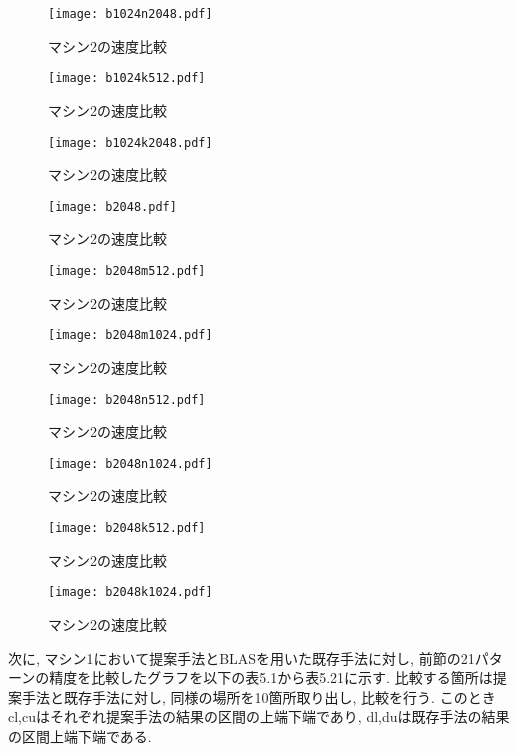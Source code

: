 \documentclass[11pt,a4paper]{jsreport}
\theoremstyle{definition}
\begin{document}
\begin{figure}[H]
\centering
\texttt{[image: b1024n2048.pdf]}
\caption{マシン2の速度比較}
\end{figure}

\begin{figure}[H]
\centering
\texttt{[image: b1024k512.pdf]}
\caption{マシン2の速度比較}
\end{figure}

\begin{figure}[H]
\centering
\texttt{[image: b1024k2048.pdf]}
\caption{マシン2の速度比較}
\end{figure}

\begin{figure}[H]
\centering
\texttt{[image: b2048.pdf]}
\caption{マシン2の速度比較}
\end{figure}

\begin{figure}[H]
\centering
\texttt{[image: b2048m512.pdf]}
\caption{マシン2の速度比較}
\end{figure}

\begin{figure}[H]
\centering
\texttt{[image: b2048m1024.pdf]}
\caption{マシン2の速度比較}
\end{figure}

\begin{figure}[H]
\centering
\texttt{[image: b2048n512.pdf]}
\caption{マシン2の速度比較}
\end{figure}

\begin{figure}[H]
\centering
\texttt{[image: b2048n1024.pdf]}
\caption{マシン2の速度比較}
\end{figure}

\begin{figure}[H]
\centering
\texttt{[image: b2048k512.pdf]}
\caption{マシン2の速度比較}
\end{figure}

\begin{figure}[H]
\centering
\texttt{[image: b2048k1024.pdf]}
\caption{マシン2の速度比較}
\end{figure}

\indent 次に, マシン1において提案手法とBLASを用いた既存手法に対し, 前節の21パターンの精度を比較したグラフを以下の表5.1から表5.21に示す. 比較する箇所は提案手法と既存手法に対し, 同様の場所を10箇所取り出し, 比較を行う. このときcl,cuはそれぞれ提案手法の結果の区間の上端下端であり, dl,duは既存手法の結果の区間上端下端である.
\end{document}
